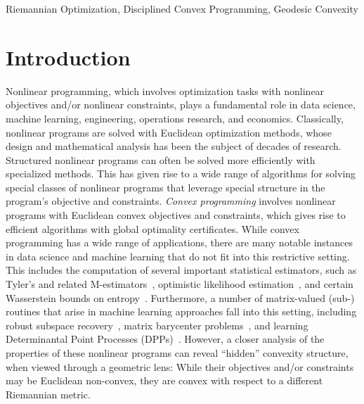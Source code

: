 \documentclass[twoside,11pt]{article}
\begin{document}
\begin{keywords}%
    Riemannian Optimization, Disciplined Convex Programming, Geodesic Convexity
\end{keywords}

\section{Introduction}
Nonlinear programming, which involves optimization tasks with nonlinear objectives and/or nonlinear constraints, plays a fundamental role in data science, machine learning, engineering, operations research, and economics. Classically, nonlinear programs are solved with Euclidean optimization methods, whose design and mathematical analysis has been the subject of decades of research. Structured nonlinear programs can often be solved more efficiently with specialized methods. This has given rise to a wide range of algorithms for solving special classes of nonlinear programs that leverage special structure in the program's objective and constraints. \emph{Convex programming} involves nonlinear programs with Euclidean convex objectives and constraints, which gives rise to efficient algorithms with global optimality certificates. While convex programming has a wide range of applications, there are many notable instances in data science and machine learning that do not fit into this restrictive setting. This includes the computation of several important statistical estimators, such as Tyler's and related M-estimators~\citep{Tyler1987,wiesel2012geodesic,ollila2014regularized}, optimistic likelihood estimation~\citep{nguyen2019calculating}, and certain Wasserstein bounds on entropy~\citep{courtade2017wasserstein}. Furthermore, a number of matrix-valued (sub-) routines that arise in machine learning approaches fall into this setting, including robust subspace recovery~\citep{zhang2016robust}, matrix barycenter problems~\citep{Bhatia1997_matrixanalysis}, and learning Determinantal Point Processes (DPPs)~\citep{mariet2015fixed}. However, a closer analysis of the properties of these nonlinear programs can reveal “hidden” convexity structure, when viewed through a geometric lens: While their objectives and/or constraints may be Euclidean non-convex, they are convex with respect to a different Riemannian metric.
\end{document}
